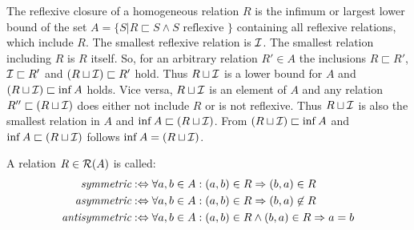 The reflexive closure of a homogeneous relation $R$ is the infimum or largest lower bound of the set $A = \{ S | R \sqsubset S \wedge S \text{ reflexive } \}$ containing all reflexive relations, which include $R$.
The smallest reflexive relation is $\mathcal{I}$.
The smallest relation including $R$ is $R$ itself.
So, for an arbitrary relation $R' \in A$ the inclusions $R \sqsubset R'$, $\mathcal{I} \sqsubset R'$ and $(R \sqcup \mathcal{I}) \sqsubset R'$ hold.
Thus $R \sqcup \mathcal{I}$ is a lower bound for $A$ and $(R \sqcup \mathcal{I}) \sqsubset \inf A$ holds.
Vice versa, $R \sqcup \mathcal{I}$ is an element of $A$ and any relation $R'' \sqsubset (R \sqcup \mathcal{I})$ does either not include $R$ or is not reflexive.
Thus $R \sqcup \mathcal{I}$ is also the smallest relation in $A$ and $\inf A \sqsubset (R \sqcup \mathcal{I})$.
From $(R \sqcup \mathcal{I}) \sqsubset \inf A$ and $\inf A \sqsubset (R \sqcup \mathcal{I})$ follows $\inf A = (R \sqcup \mathcal{I})$.
\cite{DBLP:books/sp/SchmidtS89}

\begin{definition}[Symmetry]
\label{definition:Symmetry}
A relation $R \in \mathcal{R}(A)$ is called:
\begin{align}
\emph{symmetric} 
&:\Leftrightarrow
\forall a,b \in A: (a,b) \in R \Rightarrow (b,a) \in R
\\
\emph{asymmetric} 
&:\Leftrightarrow
\forall a,b \in A: (a,b) \in R \Rightarrow (b,a) \not\in R
\\
\emph{antisymmetric} 
&:\Leftrightarrow
\forall a,b \in A: (a,b) \in R \wedge (b,a) \in R \Rightarrow a = b
\end{align}
\end{definition}


